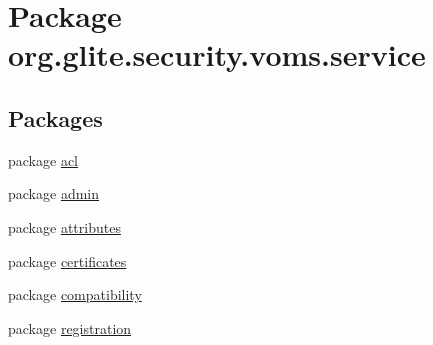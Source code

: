 \hypertarget{namespaceorg_1_1glite_1_1security_1_1voms_1_1service}{
\section{Package org.glite.security.voms.service}
\label{namespaceorg_1_1glite_1_1security_1_1voms_1_1service}
}
\subsection*{Packages}
\begin{DoxyCompactItemize}
\item 
package \hyperlink{namespaceorg_1_1glite_1_1security_1_1voms_1_1service_1_1acl}{acl}
\item 
package \hyperlink{namespaceorg_1_1glite_1_1security_1_1voms_1_1service_1_1admin}{admin}
\item 
package \hyperlink{namespaceorg_1_1glite_1_1security_1_1voms_1_1service_1_1attributes}{attributes}
\item 
package \hyperlink{namespaceorg_1_1glite_1_1security_1_1voms_1_1service_1_1certificates}{certificates}
\item 
package \hyperlink{namespaceorg_1_1glite_1_1security_1_1voms_1_1service_1_1compatibility}{compatibility}
\item 
package \hyperlink{namespaceorg_1_1glite_1_1security_1_1voms_1_1service_1_1registration}{registration}
\end{DoxyCompactItemize}
